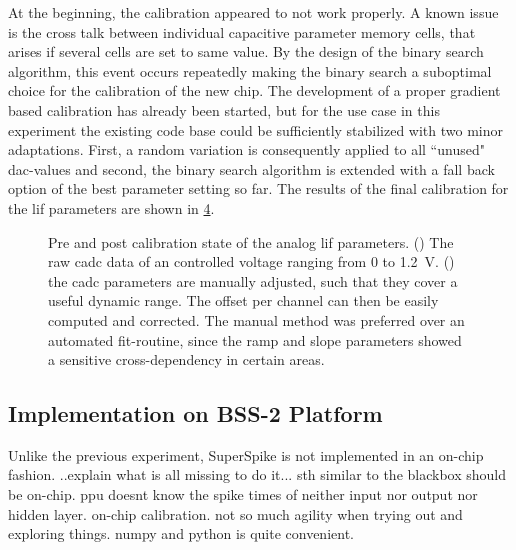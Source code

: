 At the beginning, the calibration appeared to not work properly. A known issue is the cross talk between individual capacitive parameter memory cells, that arises if several cells are set to same value. By the design of the binary search algorithm, this event occurs repeatedly making the binary search a suboptimal choice for the calibration of the new chip. The development of a proper gradient based calibration has already been started, but for the use case in this experiment the existing code base could be sufficiently stabilized with two minor adaptations. First, a random variation is consequently applied to all ``unused" \gls{dac}-values and second, the binary search algorithm is extended with a fall back option of the best parameter setting so far. The results of the final calibration for the \gls{lif} parameters are shown in \cref{hxprepostcalib}.
\begin{figure}
	\begin{subfigure}{0.32\textwidth}
		\caption{}
		\centering
		
		\label{hxprepostvleak}
	\end{subfigure}
	\begin{subfigure}{0.32\textwidth}
		\caption{}
		\centering
		
		\label{hxprepostvreset}
	\end{subfigure}
	\begin{subfigure}{0.32\textwidth}
	\caption{}
	\centering
	
	\label{hxprepostvthreshold}
\end{subfigure}
	\caption[Pre and post calibration state of the analog \gls{lif} parameters.]{Pre and post calibration state of the analog \gls{lif} parameters. () The raw cadc data of an controlled voltage ranging from 0 to \SI{1.2}{\V}. () the cadc parameters are manually adjusted, such that they cover a useful dynamic range. The offset per channel can then be easily computed and corrected. The manual method was preferred over an automated fit-routine, since the ramp and slope parameters showed a sensitive cross-dependency in certain areas.}
	\label{hxprepostcalib}
\end{figure}

\subsection{Implementation on BSS-2 Platform}
Unlike the previous experiment, SuperSpike is not implemented in an on-chip fashion. ..explain what is all missing to do it...
sth similar to the blackbox should be on-chip. ppu doesnt know the spike times of neither input nor output nor hidden layer. on-chip calibration. not so much agility when trying out and exploring things. numpy and python is quite convenient.

